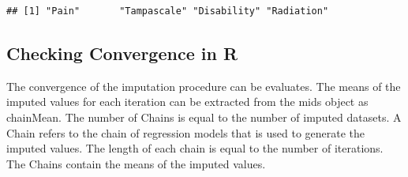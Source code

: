 \documentclass[]{book}
\newenvironment{Shaded}{\begin{snugshade}}{\end{snugshade}}
\newcommand{\OperatorTok}[1]{\textcolor[rgb]{0.81,0.36,0.00}{\textbf{#1}}}
\newcommand{\NormalTok}[1]{#1}
\begin{document}
\begin{verbatim}
## [1] "Pain"       "Tampascale" "Disability" "Radiation"
\end{verbatim}

\subsection{Checking Convergence in R}\label{checking-convergence-in-r}

The convergence of the imputation procedure can be evaluates. The means
of the imputed values for each iteration can be extracted from the mids
object as chainMean. The number of Chains is equal to the number of
imputed datasets. A Chain refers to the chain of regression models that
is used to generate the imputed values. The length of each chain is
equal to the number of iterations. The Chains contain the means of the
imputed values.

\begin{Shaded}
\end{Shaded}
\end{document}
